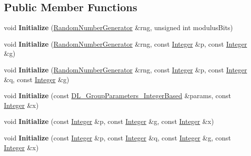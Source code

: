 \subsection*{Public Member Functions}
\begin{DoxyCompactItemize}
\item 
\hypertarget{class_d_l___private_key___g_f_p_ad069712f5fa3ce6761d3f24d9c55b97d}{
void {\bfseries Initialize} (\hyperlink{class_random_number_generator}{RandomNumberGenerator} \&rng, unsigned int modulusBits)}
\label{class_d_l___private_key___g_f_p_ad069712f5fa3ce6761d3f24d9c55b97d}

\item 
\hypertarget{class_d_l___private_key___g_f_p_aa9a70c3bbfed80f78b2303f78c5cc65f}{
void {\bfseries Initialize} (\hyperlink{class_random_number_generator}{RandomNumberGenerator} \&rng, const \hyperlink{class_integer}{Integer} \&p, const \hyperlink{class_integer}{Integer} \&g)}
\label{class_d_l___private_key___g_f_p_aa9a70c3bbfed80f78b2303f78c5cc65f}

\item 
\hypertarget{class_d_l___private_key___g_f_p_a2783fbb6b0bf3d8984fa639260f9b1f2}{
void {\bfseries Initialize} (\hyperlink{class_random_number_generator}{RandomNumberGenerator} \&rng, const \hyperlink{class_integer}{Integer} \&p, const \hyperlink{class_integer}{Integer} \&q, const \hyperlink{class_integer}{Integer} \&g)}
\label{class_d_l___private_key___g_f_p_a2783fbb6b0bf3d8984fa639260f9b1f2}

\item 
\hypertarget{class_d_l___private_key___g_f_p_af4fe22ddafeaf3f9c1ca455fe865ea02}{
void {\bfseries Initialize} (const \hyperlink{class_d_l___group_parameters___integer_based}{DL\_\-GroupParameters\_\-IntegerBased} \&params, const \hyperlink{class_integer}{Integer} \&x)}
\label{class_d_l___private_key___g_f_p_af4fe22ddafeaf3f9c1ca455fe865ea02}

\item 
\hypertarget{class_d_l___private_key___g_f_p_ae104770a2623183d9b7acd0147322532}{
void {\bfseries Initialize} (const \hyperlink{class_integer}{Integer} \&p, const \hyperlink{class_integer}{Integer} \&g, const \hyperlink{class_integer}{Integer} \&x)}
\label{class_d_l___private_key___g_f_p_ae104770a2623183d9b7acd0147322532}

\item 
\hypertarget{class_d_l___private_key___g_f_p_ad81584c72391752ad51900e846bcca63}{
void {\bfseries Initialize} (const \hyperlink{class_integer}{Integer} \&p, const \hyperlink{class_integer}{Integer} \&q, const \hyperlink{class_integer}{Integer} \&g, const \hyperlink{class_integer}{Integer} \&x)}
\label{class_d_l___private_key___g_f_p_ad81584c72391752ad51900e846bcca63}

\end{DoxyCompactItemize}


